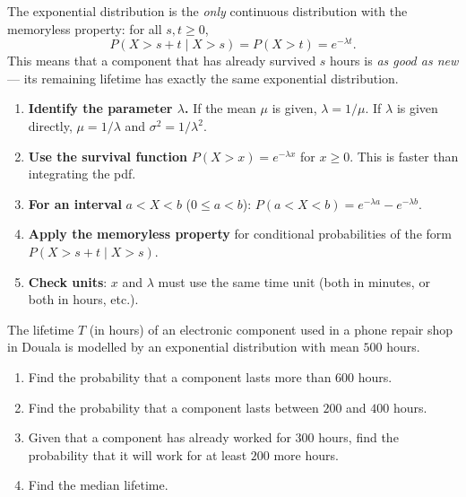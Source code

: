 \documentclass[11pt]{article}
\begin{document}
\begin{propriete}
The exponential distribution is the \emph{only} continuous distribution with the memoryless property: for all $s, t \geq 0$,
\[
P(X > s + t \mid X > s) = P(X > t) = e^{-\lambda t}.
\]
This means that a component that has already survived $s$ hours is \emph{as good as new} — its remaining lifetime has exactly the same exponential distribution.
\end{propriete}

\begin{methode}
\begin{enumerate}
\item \textbf{Identify the parameter $\lambda$.} If the mean $\mu$ is given, $\lambda = 1/\mu$. If $\lambda$ is given directly, $\mu = 1/\lambda$ and $\sigma^{2} = 1/\lambda^{2}$.
\item \textbf{Use the survival function} $P(X > x) = e^{-\lambda x}$ for $x \geq 0$. This is faster than integrating the pdf.
\item \textbf{For an interval} $a < X < b$ ($0 \leq a < b$): $P(a < X < b) = e^{-\lambda a} - e^{-\lambda b}$.
\item \textbf{Apply the memoryless property} for conditional probabilities of the form $P(X > s+t \mid X > s)$.
\item \textbf{Check units}: $x$ and $\lambda$ must use the same time unit (both in minutes, or both in hours, etc.).
\end{enumerate}
\end{methode}

\begin{exemplebox}
The lifetime $T$ (in hours) of an electronic component used in a phone repair shop in Douala is modelled by an exponential distribution with mean $500$ hours.
\begin{enumerate}
\item[(a)] Find the probability that a component lasts more than $600$ hours.
\item[(b)] Find the probability that a component lasts between $200$ and $400$ hours.
\item[(c)] Given that a component has already worked for $300$ hours, find the probability that it will work for at least $200$ more hours.
\item[(d)] Find the median lifetime.
\end{enumerate}
\end{exemplebox}
\end{document}
